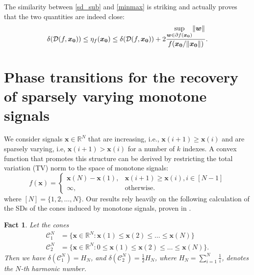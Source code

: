 \documentclass[11pt]{article}
\newcommand{\be}{\begin{equation}}
\newcommand{\ee}{\end{equation}}
\newtheorem{fact}[proposition]{Fact}
\begin{document}
\noindent The similarity between \eqref{sd_sub} and \eqref{minmax} is striking and actually \cite{ALMT14} proves that the two quantities are indeed close:
\[
	\delta(\mathcal{D}(f,\bm{x_0})) \leq \eta_f(\bm{x_0}) \leq \delta(\mathcal{D}(f,\bm{x_0})) + 2\dfrac{\underset{\tiny{\bm{w}\in\partial f(\bm{x_0})}}{\sup}\|\bm{w}\|}{f(\bm{x_0}/\|\bm{x_0}\|)}.
\]


\section{Phase transitions for the recovery of sparsely varying monotone signals}

We consider signals $\bm{x}\in\mathbb{R}^N$ that are increasing, i.e., $\bm{x}(i+1) \geq \bm{x}(i)$ and are sparsely varying, i.e, $\bm{x}(i+1) > \bm{x}(i)$ for a number of $k$ indexes. %
A convex function that promotes this structure can be derived by restricting the total variation (TV) norm to the space of monotone signals:
\be
	f(\bm{x}) = \left\{ \begin{array}{ll} \bm{x}(N) - \bm{x}(1), & \bm{x}(i+1) \geq \bm{x}(i), i \in [N-1] \\ \infty, & \text{otherwise.} \end{array} \right.
	\label{NRTV}
\ee
where $[N] = \{1,2,\ldots,N\}$. %
Our results rely heavily on the following calculation of the SDs of the cones induced by monotone signals, proven in \citet[App.~C.4]{ALMT14}.
\begin{fact}
	Let the cones 
	\[ \begin{split}
		\mathcal{C}_1^N & = \{ \bm{x} \in \mathbb{R}^N: \bm{x}(1) \leq \bm{x}(2) \leq \ldots \leq \bm{x}(N) \} \\ %
		\mathcal{C}_2^N & = \{ \bm{x} \in \mathbb{R}^N: 0 \leq \bm{x}(1) \leq \bm{x}(2) \leq \ldots \leq \bm{x}(N)  \}.
	\end{split} \]
	Then we  have $\delta(\mathcal{C}_1^N) = H_N$, and $\delta(\mathcal{C}_2^N) = \frac{1}{2}H_N$, where $H_N = \sum_{i=1}^N\frac{1}{i}$, denotes the $N$-th harmonic number.
	\label{chambers}
\end{fact}
\end{document}

